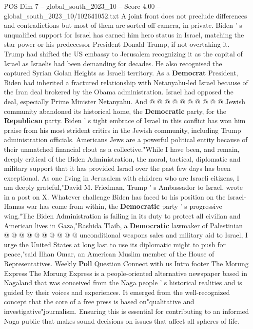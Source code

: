 \begin{textsample}{POS Dim 7 – global\_south\_2023\_10 – Score 4.00 – global\_south\_2023\_10/102641052.txt}
A joint front does not preclude differences and contradictions but most of them are sorted off camera, in private.
Biden ' s unqualified support for Israel has earned him hero status in Israel, matching the star power or his predecessor President Donald Trump, if not overtaking it.
Trump had shifted the US embassy to Jerusalem recognizing it as the capital of Israel as Israelis had been demanding for decades.
He also recognised the captured Syrian Golan Heights as Israeli territory.
As a \textbf{Democrat} President, Biden had inherited a fractured relationship with Netanyahu-led Israel because of the Iran deal brokered by the Obama administration.
Israel had opposed the deal, especially Prime Minister Netanyahu.
And @ @ @ @ @ @ @ @ @ @ Jewish community abandoned its historical home, the \textbf{Democratic} party, for the \textbf{Republican} party.
Biden ' s tight embrace of Israel in this conflict has won him praise from his most strident critics in the Jewish community, including Trump administration officials.
Americans Jews are a powerful political entity because of their unmatched financial clout as a collective."While I have been, and remain, deeply critical of the Biden Administration, the moral, tactical, diplomatic and military support that it has provided Israel over the past few days has been exceptional.
As one living in Jerusalem with children who are Israeli citizens, I am deeply grateful,"David M.
Friedman, Trump ' s Ambassador to Israel, wrote in a post on X.
Whatever challenge Biden has faced to his position on the Israel-Hamas war has come from within, the \textbf{Democratic} party ' s progressive wing."The Biden Administration is failing in its duty to protect all civilian and American lives in Gaza,"Rashida Tlaib, a \textbf{Democratic} lawmaker of Palestinian @ @ @ @ @ @ @ @ @ @ unconditional weapons sales and military aid to Israel, I urge the United States at long last to use its diplomatic might to push for peace,"said Ilhan Omar, an American Muslim member of the House of Representatives.
Weekly \textbf{Poll} Question Connect with us Intro footer The Morung Express The Morung Express is a people-oriented alternative newspaper based in Nagaland that was conceived from the Naga people ' s historical realities and is guided by their voices and experiences.
It emerged from the well-recognized concept that the core of a free press is based on"qualitative and investigative"journalism.
Ensuring this is essential for contributing to an informed Naga public that makes sound decisions on issues that affect all spheres of life.

\end{textsample}
